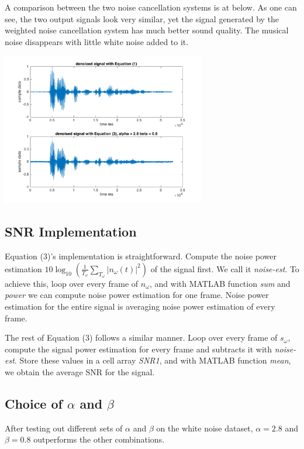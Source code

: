 \documentclass[journal]{IEEEtran}
\begin{document}
\begin{flushleft}
A comparison between the two noise cancellation systems is at below. As one can see, the two output signals look very similar, yet the signal generated by the weighted noise cancellation system has much better sound quality. The musical noise disappears with little white noise added to it. 
\end{flushleft}
\centering 
\includegraphics[width=3.5in]{plot3}

\subsection{SNR Implementation}
\begin{flushleft}
Equation (3)'s implementation is straightforward. Compute the noise power estimation $10\log_{10}(\frac{1}{T_\omega}\sum_{T_\omega} |n_\omega(t)|^2)$ of the signal first. We call it \textit{noise-est}. To achieve this, loop over every frame of $n_\omega$, and with MATLAB function \textit{sum} and \textit{power} we can compute noise power estimation for one frame. Noise power estimation for the entire signal is averaging noise power estimation of every frame. 
\end{flushleft}

\begin{flushleft}
The rest of Equation (3) follows a similar manner. Loop over every frame of $s_\omega$, compute the signal power estimation for every frame and subtracts it with \textit{noise-est}. Store these values in a cell array \textit{SNR1}, and with MATLAB function \textit{mean}, we obtain the average SNR for the signal. 
\end{flushleft}

\subsection{Choice of $\alpha$ and $\beta$}
\begin{flushleft}
After testing out different sets of $\alpha$ and $\beta$ on the white noise dataset, $\alpha = 2.8$ and $\beta = 0.8$ outperforms the other combinations. 
\end{flushleft}
  
\end{document}
